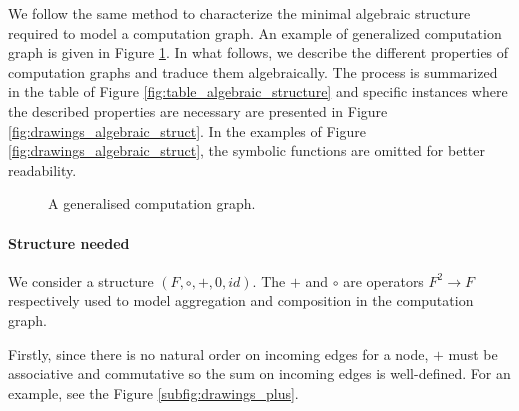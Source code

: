 \documentclass[11pt,a4paper]{article}
\theoremstyle{definition}
\begin{document}
	We follow the same method to characterize the minimal algebraic structure required to model a computation graph. An example of generalized computation graph is given in Figure \ref{fig:graphe_calc_abstr}. In what follows, we describe the different properties of computation graphs and traduce them algebraically. The process is summarized in the table of Figure \ref{fig:table_algebraic_structure} and specific instances where the described properties are necessary are presented in Figure \ref{fig:drawings_algebraic_struct}. In the examples of Figure \ref{fig:drawings_algebraic_struct}, the symbolic functions are omitted for better readability.

	\begin{figure}
	\centering
	\caption{A generalised computation graph.}
	\label{fig:graphe_calc_abstr}
	\end{figure}

	\paragraph{Structure needed} We consider a structure $(F,\circ,+,0,id)$. The $+$ and $\circ$ are operators $F^2 \to F$ respectively used to model aggregation and composition in the computation graph.

Firstly, since there is no natural order on incoming edges for a node, $+$ must be associative and commutative so the sum on incoming edges is well-defined. For an example, see the Figure \ref{subfig:drawings_plus}.
\end{document}
